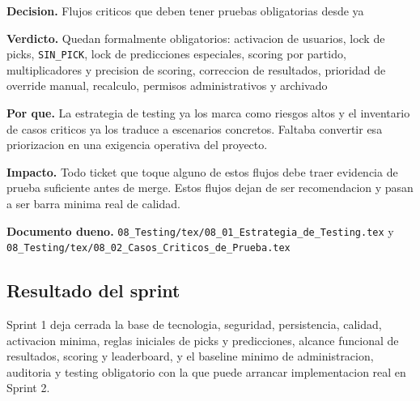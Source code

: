 \begin{docnote}
\textbf{Decision.} Flujos criticos que deben tener pruebas obligatorias desde ya

\textbf{Verdicto.} Quedan formalmente obligatorios: activacion de usuarios, lock de picks, \texttt{SIN\_PICK}, lock de predicciones especiales, scoring por partido, multiplicadores y precision de scoring, correccion de resultados, prioridad de override manual, recalculo, permisos administrativos y archivado

\textbf{Por que.} La estrategia de testing ya los marca como riesgos altos y el inventario de casos criticos ya los traduce a escenarios concretos. Faltaba convertir esa priorizacion en una exigencia operativa del proyecto.

\textbf{Impacto.} Todo ticket que toque alguno de estos flujos debe traer evidencia de prueba suficiente antes de merge. Estos flujos dejan de ser recomendacion y pasan a ser barra minima real de calidad.

\textbf{Documento dueno.} \texttt{08\_Testing/tex/08\_01\_Estrategia\_de\_Testing.tex} y \texttt{08\_Testing/tex/08\_02\_Casos\_Criticos\_de\_Prueba.tex}
\end{docnote}

\subsection{Resultado del sprint}

Sprint 1 deja cerrada la base de tecnologia, seguridad, persistencia, calidad, activacion minima, reglas iniciales de picks y predicciones, alcance funcional de resultados, scoring y leaderboard, y el baseline minimo de administracion, auditoria y testing obligatorio con la que puede arrancar implementacion real en Sprint 2.
